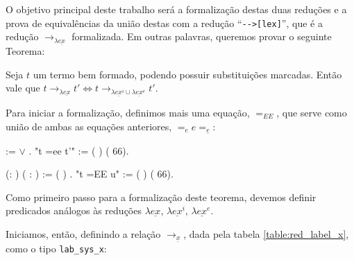O objetivo principal deste trabalho será a formalização destas duas reduções e a
prova de equivalências da união destas com a redução ``\texttt{-{}->[lex]}'', que é a
redução $\rightarrow_{\lambda \underline{ex}}$ formalizada. Em outras palavras, queremos
provar o seguinte Teorema:

\begin{teorema}\label{teo:main}
    Seja $t$ um termo bem formado, podendo possuir substituições marcadas. Então
    vale que $t \rightarrow_{\lambda \underline{ex}} t' \iff t
    \rightarrow_{\lambda \underline{ex}^i \cup \lambda \underline{ex}^e} t'$. 
\end{teorema}

Para iniciar a formalização, definimos mais uma equação, $=_{EE}$, que serve
como união de ambas as equações anteriores, $=_e e =_{\underline{e}}$:

\bigskip

\coqdocnoindent {}  
 :=    \ensuremath{\lor}
  .\coqdoceol \coqdocnoindent
{} "t =ee t'" := ( 
) (  66).\coqdoceol \coqdocemptyline


\coqdocnoindent {} 
(: ) ( : ) :=
 (
)   .\coqdoceol \coqdocnoindent
{} "t =EE u" := ( 
) (  66).\coqdoceol \coqdocemptyline


Como primeiro passo para a formalização deste teorema, devemos definir
predicados análogos às reduções $\lambda \underline{ex}$, $\lambda
\underline{ex}^i$, $\lambda \underline{ex}^e$.

Iniciamos, então, definindo a relação $\rightarrow_{\underline{x}}$, dada pela
tabela \ref{table:red_label_x}, como o tipo \texttt{lab\_sys\_x}:

\bigskip

